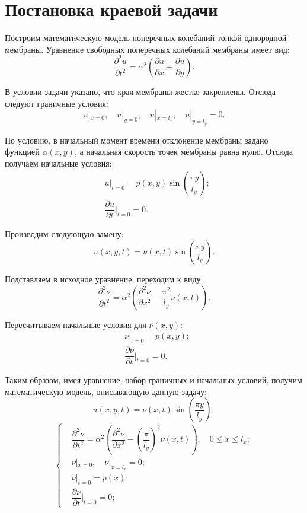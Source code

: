 \section{Постановка краевой задачи}
{
	Построим математическую модель поперечных колебаний тонкой однородной мембраны.
	Уравнение свободных поперечных колебаний мембраны имеет вид:
	\begin{equation}\label{source_func}
	\dfrac{\partial^2 u}{\partial t^2} = \alpha^2(
	\dfrac{\partial u}{\partial x} + 
	\dfrac{\partial u}{\partial y}).
	\end{equation}
	
	В условии задачи указано, что края мембраны жестко закреплены. Отсюда
	следуют граничные условия:
	\begin{equation}
	u|_{x=0}, \quad
	u|_{y=0},  \quad
	u|_{x=l_x}, \quad
	u|_{y=l_y} = 0.
	\end{equation}
	
	По условию, в начальный момент времени отклонение мембраны задано функцией $\alpha(x, y)$, а начальная скорость точек мембраны равна нулю. Отсюда получаем начальные условия:
	\begin{align*}
	&  u|_{t=0} = p(x,y)\sin(\dfrac{\pi y}{l_y});\\        
	& \dfrac{\partial u}{\partial t}|_{t=0} = 0.
	\end{align*}
	
	Производим следующую замену:
	\begin{equation}\label{change}
	u(x,y,t) = \nu(x,t)\sin (\dfrac{\pi y}{l_y}).
	\end{equation}    
	
	Подставляем в исходное уравнение, переходим к виду:
	\begin{equation}
	\dfrac{\partial^2 \nu}{\partial t^2} = \alpha^2(\dfrac{\partial^2 \nu}{\partial x^2}
	- \dfrac{\pi^2}{l_y}\nu(x, t)).
	\end{equation}
	
	Пересчитываем начальные условия для $\nu(x,y)$:
	\begin{align*}
	&  \nu|_{t=0} = p(x,y);\\        
	& \dfrac{\partial \nu}{\partial t}|_{t=0} = 0.
	\end{align*}
	
	
	Таким образом, имея уравнение, набор граничных и начальных условий, получим математическую модель, описывающую данную задачу:
	\begin{equation}
	u(x,y,t) = \nu(x,t)\sin (\dfrac{\pi y}{l_y});
	\end{equation}
	\begin{equation}\label{full_initial_problem}
	\left\{
	\begin{split}
	& \dfrac{\partial^2 \nu}{\partial t^2} = \alpha^2\left(\dfrac{\partial^2 \nu}{\partial x^2}
	- \left(\dfrac{\pi}{l_y}\right)^2\nu(x, t)\right), {\quad 0 \le x \le l_x;} \\
	&\nu|_{x=0}, \quad  
	\nu|_{x=l_x} = 0;\\
	&  \nu|_{t=0} = p(x);\\        
	& \dfrac{\partial \nu}{\partial t}|_{t=0} = 0;
	\end{split}
	\right.
	\end{equation}
}


